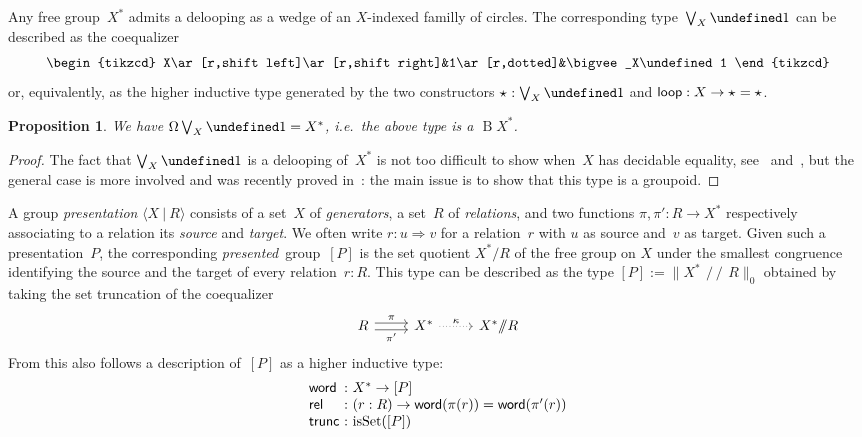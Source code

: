 \documentclass[10pt,a4paper]{amsart}
\newtheorem{proposition}[theorem]{Proposition}
\theoremstyle{definition}
\newcommand{\freegroup}[1]{#1^*} %
\newcommand{\pres}[2]{\langle #1\ |\ #2\rangle} %
\newcommand{\pgroup}[1]{[#1]} %
\let\S\undefined
\newcommand{\S}[1]{\operatorname{S}^{#1}} %
\newcommand{\B}{\operatorname{B}} %
\newcommand{\pt}[1]{\star_{#1}} %
\newcommand{\trunc}[2]{\|#2\|_{#1}} %
\newcommand{\strunc}[1]{\trunc0{#1}} %
\newcommand{\defd}{:=} %
\newcommand{\Loop}{\operatorname{\Omega}} %
\newcommand{\fst}{\pi}
\newcommand{\snd}{\pi'}
\newcommand{\isSet}{\operatorname{isSet}} %
\newcommand{\hq}{\mathop{\!/\!\!/\!}} %
\newcommand{\constructor}[1]{\operatorname{\textsf{\textup{#1}}}}
\newcommand{\cloop}{\constructor{loop}}
\newcommand{\ctrunc}{\constructor{trunc}}
\newcommand{\To}{\Rightarrow}
\newcommand{\ie}{i.e.~}
\begin{document}
Any free group~$\freegroup X$ admits a delooping as a wedge of an $X$-indexed familly of circles. The corresponding type~$\bigvee_X\S1$ can be described as the coequalizer
\begin{equation}
  \label{wedge-of-circles}
  \begin{tikzcd}
    X\ar[r,shift left]\ar[r,shift right]&1\ar[r,dotted]&\bigvee_X\S1
  \end{tikzcd}
\end{equation}
or, equivalently, as the higher inductive type
generated by the two constructors $\pt{}:\bigvee_X\S1$ and $\cloop:X\to\pt{}=\pt{}$.

\begin{proposition}
  \label{bouquet-loop-space}
  We have $\Loop\bigvee_X\S1=\freegroup{X}$, \ie the above type is a $\B\freegroup X$.
\end{proposition}
\begin{proof}
  The fact that $\bigvee_X\S1$ is a delooping of~$\freegroup X$ is not too difficult to show when~$X$
  has decidable equality, see~\cite[Exercise 8.2]{hottbook}
  and~\cite{kraus2018free}, but the general case is more involved and was recently proved
  in~\cite{warn2023path}: the main issue is to show that this type is a groupoid.
\end{proof}

A group \emph{presentation} $\pres XR$ consists of a set~$X$ of
\emph{generators}, a set~$R$ of \emph{relations}, and two functions
$\fst,\snd:R\to\freegroup X$ respectively associating to a relation its
\emph{source} and \emph{target}. We often write $r:u\To v$ for a
relation~$r$ with $u$ as source and~$v$ as target.
%
Given such a presentation~$P$, the corresponding \emph{presented} group~$\pgroup P$ is the set quotient $\freegroup{X}/R$ of the free group on $X$ under the
smallest congruence identifying the source and the target of every
relation~$r:R$. This type can be described as the type
$\pgroup P\defd\strunc{{\freegroup X}\hq R}$ obtained by taking the set
truncation of the coequalizer
\[
  \begin{tikzcd}
    R
    \ar[r,shift left,"\fst"]
    \ar[r,shift right,"\snd"']
    &
    \freegroup X
    \ar[r,dotted,"\kappa"]
    &
    \freegroup X\hq R
  \end{tikzcd}
\]
From this also follows a description of~$\pgroup P$ as a higher inductive type:
\[
  \begin{array}{l@{\ :\ }l}
    \constructor{word}&\freegroup X\to\pgroup P\\
    \constructor{rel}&(r:R)\to\constructor{word}(\fst(r))=\constructor{word}(\snd(r))\\
    \ctrunc&\isSet(\pgroup P)
  \end{array}
\]
\end{document}
